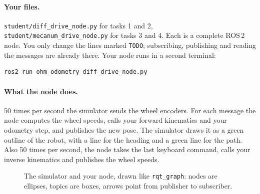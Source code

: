 \documentclass[11pt,a4paper,parskip=half]{scrartcl}
\newcommand{\thema}[1]{\texttt{#1}}
\newcommand{\datei}[1]{\texttt{#1}}
\begin{document}
\paragraph{Your files.} \datei{student/diff\_drive\_node.py} for tasks 1 and 2,
\datei{student/mecanum\_drive\_node.py} for tasks 3 and 4. Each is a complete ROS\,2 node. You only
change the lines marked \thema{TODO}; subscribing, publishing and reading the messages are already
there. Your node runs in a second terminal:
\begin{lstlisting}
ros2 run ohm_odometry diff_drive_node.py
\end{lstlisting}

\paragraph{What the node does.} 50 times per second the simulator sends the wheel encoders. For each
message the node computes the wheel speeds, calls your forward kinematics and your odometry step,
and publishes the new pose. The simulator draws it as a green outline of the robot, with a line for
the heading and a green line for the path. Also 50 times per second, the node takes the last keyboard
command, calls your inverse kinematics and publishes the wheel speeds.

\begin{figure}[ht]
  \centering
  
  \caption{The simulator and your node, drawn like \thema{rqt\_graph}: nodes are ellipses, topics are
    boxes, arrows point from publisher to subscriber.}
  \label{fig:graph}
\end{figure}

\newpage
\end{document}
